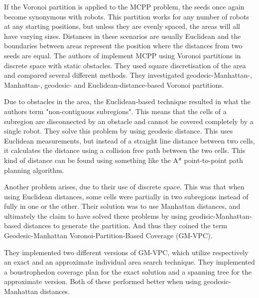 If the Voronoi partition is applied to the MCPP problem, the seeds once again become synonymous with robots. This partition works for any number of robots at any starting positions, but unless they are evenly spaced, the areas will all have varying sizes. Distances in these scenarios are usually Euclidean and the boundaries between areas represent the position where the distances from two seeds are equal. The authors of \cite{Nair2020} implement MCPP using Voronoi partitions in discrete space with static obstacles. They used square discretisation of the area and compared several different methods. They investigated geodesic-Manhattan-, Manhattan-, geodesic- and Euclidean-distance-based Voronoi partitions. 

Due to obstacles in the area, the Euclidean-based technique resulted in what the authors term "non-contiguous subregions". This means that the cells of a subregion are disconnected by an obstacle and cannot be covered completely by a single robot. They solve this problem by using geodesic distance. This uses Euclidean measurements, but instead of a straight line distance between two cells, it calculates the distance using a collision free path between the two cells. This kind of distance can be found using something like the A* point-to-point path planning algorithm.

Another problem arises, due to their use of discrete space. This was that when using Euclidean distances, some cells were partially in two subregions instead of fully in one or the other. Their solution was to use Manhattan distances, and ultimately the claim to have solved these problems by using geodisic-Manhattan-based distances to generate the partition. And thus they coined the term Geodesic-Manhattan Voronoi-Partition-Based Coverage (GM-VPC).

They implemented two different versions of GM-VPC, which utilize respectively an exact and an approximate individual area search technique. They implemented a boustrophedon coverage plan for the exact solution and a spanning tree for the approximate version. Both of these performed better when using geodesic-Manhattan distances.   

